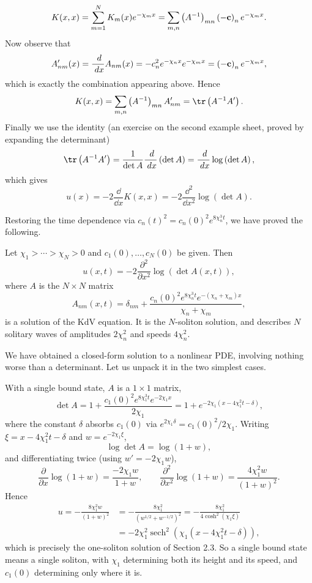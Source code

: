 \documentclass[a4paper]{scrartcl}
\DeclareMathOperator{\sech}{sech}
\begin{document}
$$
K(x,x) = \sum_{m=1}^NK_m(x)e^{-\chi_mx} = \sum_{m,n}\left(A^{-1}\right)_{mn}\left(-\mathbf{c}\right)_ne^{-\chi_mx}.
$$
Now observe that
$$
A'_{nm}(x) = \frac{\; d}{\; d x}A_{nm}(x) = -c_n^2e^{-\chi_nx}e^{-\chi_mx} = \left(-\mathbf{c}\right)_ne^{-\chi_mx},
$$
which is exactly the combination appearing above. Hence
$$
K(x,x) = \sum_{m,n}\left(A^{-1}\right)_{mn}A'_{nm} = \tr\left(A^{-1}A'\right).
$$
Finally we use the identity (an exercise on the second example sheet, proved by expanding the determinant)
$$
\tr\left(A^{-1}A'\right) = \frac{1}{\det A}\frac{\dd}{\dd x}\left(\det A\right) = \frac{\dd}{\dd x}\log\left(\det A\right),
$$
which gives
$$
u(x) = -2\frac{\dd}{\dd x}K(x,x) = -2\frac{\dd^2}{\dd x^2}\log\left(\det A\right).
$$

Restoring the time dependence via $c_n(t)^2 = c_n(0)^2e^{8\chi_n^3t}$, we have proved the following.

\begin{theorem}
	Let $\chi_1 > \cdots > \chi_N > 0$ and $c_1(0), \dots, c_N(0)$ be given. Then
	$$
	u(x,t) = -2\frac{\partial^2}{\partial x^2}\log\left(\det A(x,t)\right),
	$$
	where $A$ is the $N\times N$ matrix
	$$
	A_{nm}(x,t) = \delta_{nm} + \frac{c_n(0)^2e^{8\chi_n^3t}e^{-(\chi_n+\chi_m)x}}{\chi_n+\chi_m},
	$$
	is a solution of the KdV equation. It is the $N$-soliton solution, and describes $N$ solitary waves of amplitudes $2\chi_n^2$ and speeds $4\chi_n^2$.
\end{theorem}

We have obtained a closed-form solution to a nonlinear PDE, involving nothing worse than a determinant. Let us unpack it in the two simplest cases.

\begin{example}[$N = 1$]
	With a single bound state, $A$ is a $1\times1$ matrix,
	$$
	\det A = 1 + \frac{c_1(0)^2e^{8\chi_1^3t}e^{-2\chi_1x}}{2\chi_1} = 1 + e^{-2\chi_1(x - 4\chi_1^2t - \delta)},
	$$
	where the constant $\delta$ absorbs $c_1(0)$ via $e^{2\chi_1\delta} = c_1(0)^2/2\chi_1$. Writing $\xi = x - 4\chi_1^2t-\delta$ and $w = e^{-2\chi_1\xi}$,
	$$
	\log\det A = \log(1 + w),
	$$
	and differentiating twice (using $w' = -2\chi_1w$),
	$$
	\frac{\partial}{\partial x}\log(1+w) = \frac{-2\chi_1w}{1+w}, \qquad \frac{\partial^2}{\partial x^2}\log(1+w) = \frac{4\chi_1^2w}{(1+w)^2}.
	$$
	Hence
	\begin{align*}
		u = -\frac{8\chi_1^2w}{(1+w)^2} &= -\frac{8\chi_1^2}{\left(w^{1/2} + w^{-1/2}\right)^2} = -\frac{8\chi_1^2}{4\cosh^2(\chi_1\xi)}\\
		&= -2\chi_1^2\sech^2\left(\chi_1(x - 4\chi_1^2t - \delta)\right),
	\end{align*}
	which is precisely the one-soliton solution of Section 2.3. So a single bound state means a single soliton, with $\chi_1$ determining both its height and its speed, and $c_1(0)$ determining only where it is.
\end{example}
\end{document}

